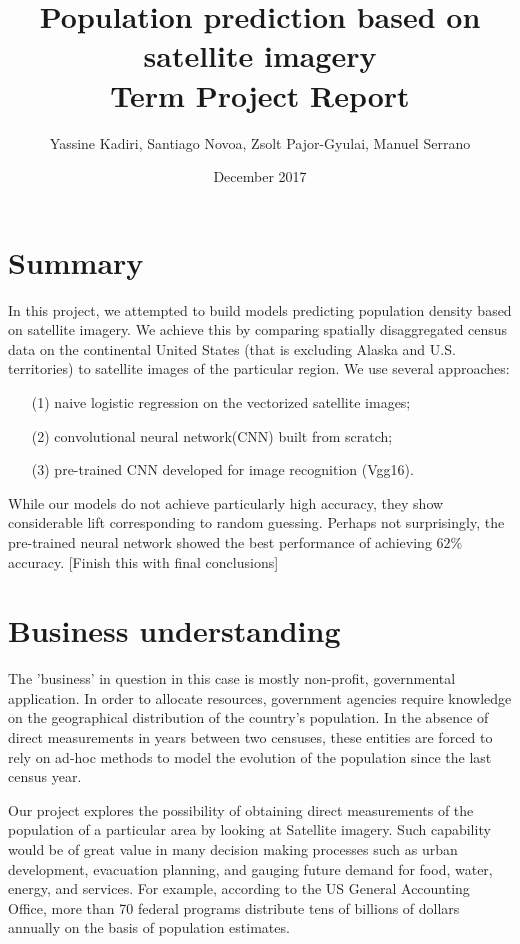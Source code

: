 \documentclass{article}
\begin{document}
\title{Population prediction based on satellite imagery\\
Term Project Report} 

\date{December 2017}
\author{Yassine Kadiri, Santiago Novoa, Zsolt Pajor-Gyulai, Manuel Serrano}
\maketitle

\doublespacing


\section{Summary}
In this project, we attempted to build models predicting population density based on satellite imagery. We achieve this by comparing spatially disaggregated census data on the continental United States (that is excluding Alaska and U.S. territories) to satellite images of the particular region. We use several approaches: 
\begin{itemize}
\item[(1)] naive logistic regression on the vectorized satellite images; 
\item[(2)] convolutional neural network(CNN) built from scratch; \item[(3)] pre-trained CNN developed for image recognition (Vgg16).
\end{itemize}

While our models do not achieve particularly high accuracy, they show considerable lift corresponding to random guessing. Perhaps not surprisingly, the pre-trained neural network showed the best performance of achieving $62\%$ accuracy. [Finish this with final conclusions]

\section{Business understanding}
The 'business' in question in this case is mostly non-profit, governmental application. In order to allocate resources, government agencies require knowledge on the geographical distribution of the country's population. In the absence of direct measurements in years between two censuses, these entities are forced to rely on ad-hoc methods to model the evolution of the population since the last census year.

Our project explores the possibility of obtaining direct measurements of the population of a particular area by looking at Satellite imagery. Such capability would be of great value in many decision making processes such as urban development, evacuation planning, and gauging future demand for food, water, energy, and services. For example, according to the US General Accounting Office, more than 70 federal programs distribute tens of billions of dollars annually on the basis of population estimates.
\end{document}
